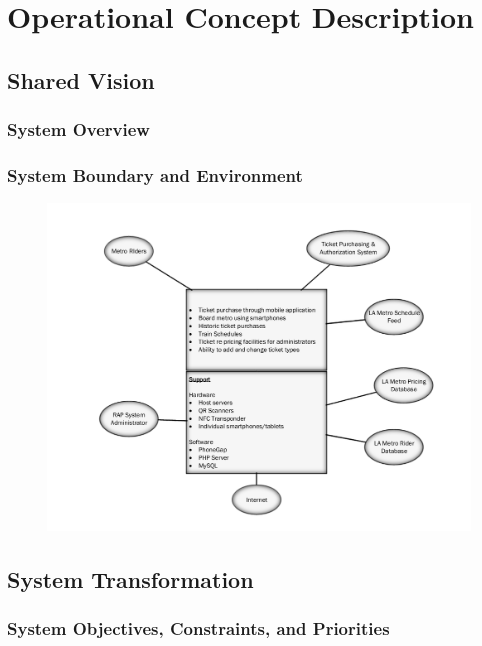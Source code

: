 \section{Operational Concept Description}


\subsection{Shared Vision}

	\subsubsection{System Overview}\begin{multicols}{2}
		
	\end{multicols}
 	\newpage

 	\subsubsection{System Boundary and Environment}
 	\begin{figure}[h]
 		\centering
 		\includegraphics[scale=0.5]{OCD/boundary.pdf}
 	\end{figure}
 	\newpage
 		
\subsection{System Transformation}
	\subsubsection{System Objectives, Constraints, and Priorities}
		
	\newpage
	

